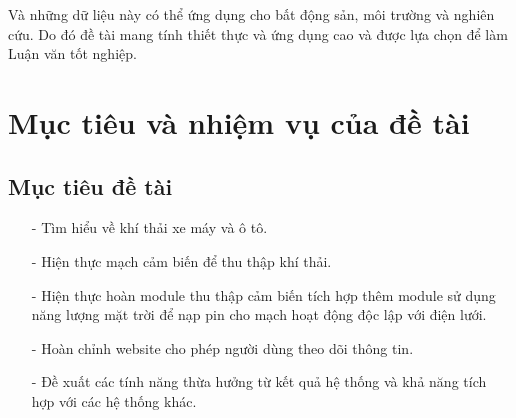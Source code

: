 Và những dữ liệu này có thể ứng dụng cho bất động sản, môi trường và nghiên cứu. Do đó đề tài mang tính thiết thực và ứng dụng cao và được lựa chọn để làm Luận văn tốt nghiệp.


\section{Mục tiêu và nhiệm vụ của đề tài} %
\label{section1.2}
\subsection{Mục tiêu đề tài}
\begin{itemize}
\item[-]Tìm hiểu về khí thải xe máy và ô tô.
\item[-]Hiện thực mạch cảm biến để thu thập khí thải.
\item[-]Hiện thực hoàn module thu thập cảm biến tích hợp thêm module sử dụng năng lượng mặt trời để nạp pin cho mạch hoạt động độc lập với điện lưới.
\item[-]Hoàn chỉnh website cho phép người dùng theo dõi thông tin.
\item[-]Đề xuất các tính năng thừa hưởng từ kết quả hệ thống và khả năng tích hợp với các hệ thống khác.
\end{itemize}



